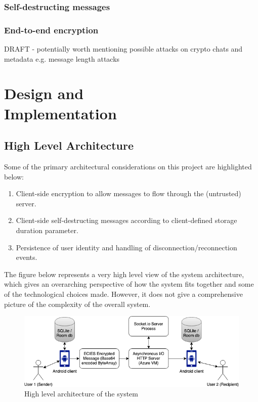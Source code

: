 \documentclass{mproj}
\begin{document}
\subsection{Self-destructing messages}


\subsection{End-to-end encryption}

DRAFT - potentially worth mentioning possible attacks on crypto chats and metadata e.g. message length attacks \cite{degabriele2021hiding}

\chapter{Design and \\ Implementation}\label{design}
\section{High Level Architecture}
Some of the primary architectural considerations on this project are highlighted below:
\begin{enumerate}
	\item Client-side encryption to allow messages to flow through the (untrusted) server.
	\item Client-side self-destructing messages according to client-defined storage duration parameter.
	\item Persistence of user identity and handling of disconnection/reconnection events.
\end{enumerate}

The figure below represents a very high level view of the system architecture, which gives an overarching perspective of how the system fits together and some of the technological choices made. However, it does not give a comprehensive picture of the complexity of the overall system.

\begin{figure}[h!]
\includegraphics[scale=0.5]{images/high-level-architecture.png}
\caption{High level architecture of the system}
\end{figure}
\end{document}

